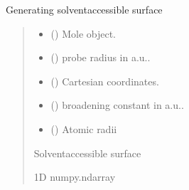 \documentclass[letterpaper,10pt,english]{sphinxmanual}
\begin{document}

\begin{fulllineitems}
\label{\detokenize{fcdft.solvent:fcdft.solvent.pbe.make_sas}}
\pysigstartsignatures
\pysiglinewithargsret
{}
{\sphinxparamcomma {}\sphinxparamcomma {}\sphinxparamcomma {}\sphinxparamcomma {}\sphinxparamcomma {}}
{}
\pysigstopsignatures
\sphinxAtStartPar
Generating solvent\sphinxhyphen{}accessible surface
\begin{quote}\begin{description}
\begin{itemize}
\item {} 
\sphinxAtStartPar
{} () \textendash{} Mole object.

\item {} 
\sphinxAtStartPar
{} () \textendash{} probe radius in a.u..

\item {} 
\sphinxAtStartPar
{} () \textendash{} Cartesian coordinates.

\item {} 
\sphinxAtStartPar
{} () \textendash{} broadening constant in a.u..

\item {} 
\sphinxAtStartPar
{} () \textendash{} Atomic radii

\end{itemize}

\sphinxAtStartPar
Solvent\sphinxhyphen{}accessible surface

\sphinxAtStartPar
1D numpy.ndarray

\end{description}\end{quote}

\end{fulllineitems}
\end{document}
